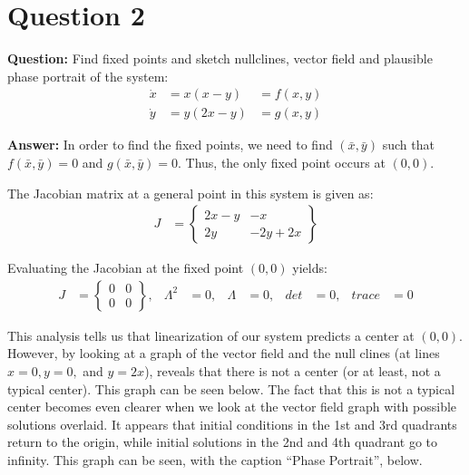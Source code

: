 \documentclass[12pt]{article}
\newenvironment{myenv}{\begin{adjustwidth}{1cm}{}}{\end{adjustwidth}}
\begin{document}
\section*{Question 2}
\begin{myenv}
\textbf{Question:} Find fixed points and sketch nullclines, vector field and plausible phase portrait of the system:
\begin{alignat*}{3}
\dot{x} &= x(x-y) &= f(x,y) \\
\dot{y} &= y(2x-y) &= g(x,y)
\end{alignat*}


\textbf{Answer:} In order to find the fixed points, we need to find $(\bar{x},\bar{y})$ such that $f(\bar{x},\bar{y}) = 0$ and $g(\bar{x},\bar{y}) = 0$. Thus, the only fixed point occurs at $(0,0)$.

The Jacobian matrix at a general point in this system is given as:
\begin{align*}
	J &= 
	\begin{Bmatrix}
	2x-y & -x \\
	2y & -2y + 2x
	\end{Bmatrix}
\end{align*}

Evaluating the Jacobian at the fixed point $(0,0)$ yields:
\begin{align*}
	J &= 
	\begin{Bmatrix}
	0 & 0 \\
	0 & 0
	\end{Bmatrix}, 	&\Lambda^2 &= 0,	&\Lambda &= 0, &det &= 0, &trace &= 0
\end{align*}
\end{myenv}

This analysis tells us that linearization of our system predicts a center at $(0,0)$. However, by looking at a graph of the vector field and the null clines (at lines $x = 0, y = 0,$ and $y = 2x$), reveals that there is not a center (or at least, not a typical center). This graph can be seen below. The fact that this is not a typical center becomes even clearer when we look at the vector field graph with possible solutions overlaid. It appears that initial conditions in the 1st and 3rd quadrants return to the origin, while initial solutions in the 2nd and 4th quadrant go to infinity. This graph can be seen, with the caption ``Phase Portrait'', below.
\end{document}

